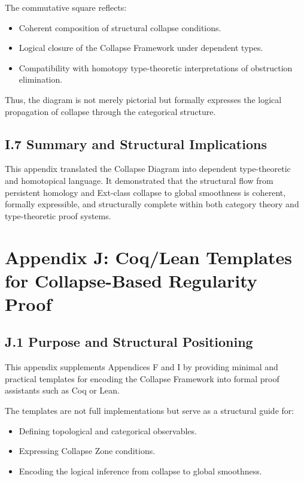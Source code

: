 \documentclass[11pt]{article}
\begin{document}
The commutative square reflects:

\begin{itemize}
  \item Coherent composition of structural collapse conditions.
  \item Logical closure of the Collapse Framework under dependent types.
  \item Compatibility with homotopy type-theoretic interpretations of obstruction elimination.
\end{itemize}

Thus, the diagram is not merely pictorial but formally expresses the logical propagation of collapse through the categorical structure.

\subsection*{I.7 Summary and Structural Implications}

This appendix translated the Collapse Diagram into dependent type-theoretic and homotopical language.  
It demonstrated that the structural flow from persistent homology and Ext-class collapse to global smoothness is coherent, formally expressible, and structurally complete within both category theory and type-theoretic proof systems.



\section*{Appendix J: Coq/Lean Templates for Collapse-Based Regularity Proof}

\subsection*{J.1 Purpose and Structural Positioning}

This appendix supplements Appendices F and I by providing minimal and practical templates for encoding the Collapse Framework into formal proof assistants such as Coq or Lean.

The templates are not full implementations but serve as a structural guide for:

\begin{itemize}
  \item Defining topological and categorical observables.
  \item Expressing Collapse Zone conditions.
  \item Encoding the logical inference from collapse to global smoothness.
\end{itemize}
\end{document}
